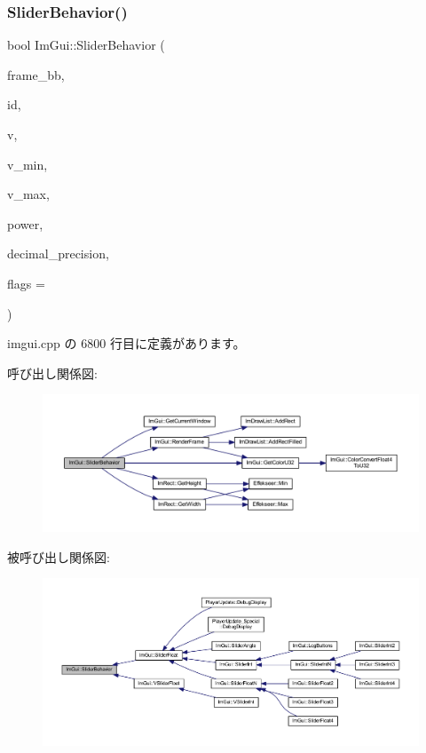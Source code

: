 \subsubsection{\texorpdfstring{Slider\+Behavior()}{SliderBehavior()}}
{\footnotesize\ttfamily bool Im\+Gui\+::\+Slider\+Behavior (\begin{DoxyParamCaption}\item[{const \mbox{\hyperlink{struct_im_rect}{Im\+Rect}} \&}]{frame\+\_\+bb,  }\item[{\mbox{\hyperlink{imgui_8h_a1785c9b6f4e16406764a85f32582236f}{Im\+Gui\+ID}}}]{id,  }\item[{float $\ast$}]{v,  }\item[{float}]{v\+\_\+min,  }\item[{float}]{v\+\_\+max,  }\item[{float}]{power,  }\item[{int}]{decimal\+\_\+precision,  }\item[{\mbox{\hyperlink{imgui__internal_8h_a50cc3e3e4beb155e2186f8c1dc057e18}{Im\+Gui\+Slider\+Flags}}}]{flags = {} }\end{DoxyParamCaption})}



 imgui.\+cpp の 6800 行目に定義があります。

呼び出し関係図\+:\nopagebreak
\begin{figure}[H]
\begin{center}
\leavevmode
\includegraphics[width=350pt]{namespace_im_gui_a3d3b2964eeba76dadaa532232c23fc97_cgraph}
\end{center}
\end{figure}
被呼び出し関係図\+:\nopagebreak
\begin{figure}[H]
\begin{center}
\leavevmode
\includegraphics[width=350pt]{namespace_im_gui_a3d3b2964eeba76dadaa532232c23fc97_icgraph}
\end{center}
\end{figure}
\mbox{\label{namespace_im_gui_a7c12e66f74025376996b7ac6d1e3a476}} 
